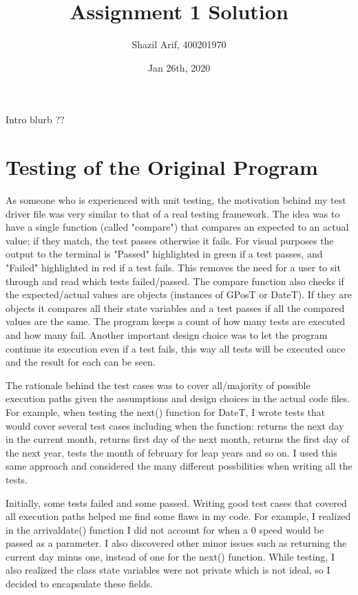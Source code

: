 \documentclass[12pt]{article}
\title{Assignment 1 Solution}
\author{Shazil Arif, 400201970}
\date{Jan 26th, 2020}
\begin{document}
\maketitle

Intro blurb ??

\section{Testing of the Original Program}

As someone who is experienced with unit testing, the motivation behind my test driver file was very similar to that of a real testing framework. The idea was to have a single function (called "compare") that compares an expected to 
an actual value; if they match, the test passes otherwise it fails. For visual purposes the output to the terminal is "Passed" highlighted in green if a test passes, and "Failed" highlighted in red if a test fails. This removes the need for a user to sit through and read which tests failed/passed. The compare function also checks if the expected/actual values are objects (instances of GPosT or DateT). If they are objects it compares all their state variables and a test passes if all the compared values are the same. The program keeps a count of how many tests are executed and how many fail. Another important design choice was to let the program continue its execution even if a test fails, this way all tests will be executed once and the result for each can be seen.

The rationale behind the test cases was to cover all/majority of possible execution paths given the assumptions and design choices in the actual code files. For example, when testing the next() function for DateT, I wrote tests that would cover several test cases including when the function: returns the next day in the current month, returns first day of the next month, returns the first day of the next year, tests the month of february for leap years and so on. I used this same approach and considered the many different possbilities when writing all the tests. 

Initially, some tests failed and some passed. Writing good test cases that covered all execution paths helped me find some flaws in my code. For example, I realized in the arrivaldate() function I did not account for when a 0 speed would be passed as a parameter. I also discovered other minor issues such as returning the current day minus one, instead of one for the next() function. While testing, I also realized the class state variables were not private which is not ideal, so I decided to encapsulate these fields.
\end{document}
